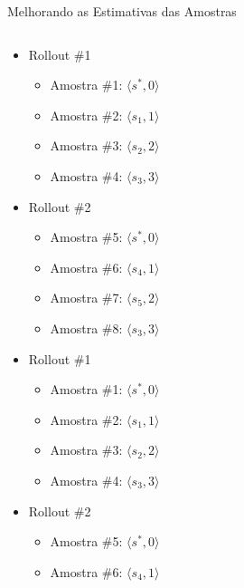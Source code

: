 \documentclass{beamer}
\begin{document}
\begin{frame}{Melhorando as Estimativas das Amostras}
\begin{columns}
\begin{column}{0.5\textwidth}
 {
    \begin{itemize}
        \item Rollout \#1
        \begin{itemize}
            \item Amostra \#1: $\langle s^*, 0 \rangle$
            \item Amostra \#2: $\langle s_1, 1 \rangle$
            \item Amostra \#3: $\langle s_2, 2 \rangle$
            \item Amostra \#4: $\langle s_3, 3 \rangle$
        \end{itemize}
    \end{itemize}
}
 {
    \begin{itemize}
        \item Rollout \#2
        \begin{itemize}
            \item Amostra \#5: $\langle s^*, 0 \rangle$
            \item Amostra \#6: $\langle s_4, 1 \rangle$
            \item Amostra \#7: $\langle s_5, 2 \rangle$
            \item Amostra \#8: $\langle s_3, 3 \rangle$
        \end{itemize}
    \end{itemize}
}
 {
    \begin{itemize}
        \item Rollout \#1
        \begin{itemize}
            \item Amostra \#1: $\langle s^*, 0 \rangle$
            \item Amostra \#2: $\langle s_1, 1 \rangle$
            \item Amostra \#3: $\langle s_2, 2 \rangle$
            \item Amostra \#4: $\langle s_3, 3 \rangle$
        \end{itemize}
        \item Rollout \#2
        \begin{itemize}
            \item Amostra \#5: $\langle s^*, 0 \rangle$
            \item Amostra \#6: $\langle s_4, 1 \rangle$

\end{itemize}
\end{itemize}}
\end{column}
\end{columns}
\end{frame}
\end{document}
